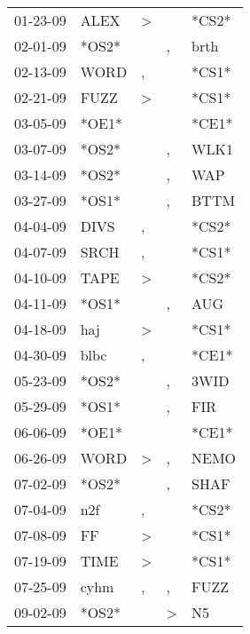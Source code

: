 \begin{supertabular}{lllll}
 01-23-09 &   ALEX &     \textgreater &                  &  *CS2* \\
 02-01-09 &  *OS2* &                  &                , &   brth \\
 02-13-09 &   WORD &                , &                  &  *CS1* \\
 02-21-09 &   FUZZ &     \textgreater &                  &  *CS1* \\
 03-05-09 &  *OE1* &                  &                  &  *CE1* \\
 03-07-09 &  *OS2* &                  &                , &   WLK1 \\
 03-14-09 &  *OS2* &                  &                , &    WAP \\
 03-27-09 &  *OS1* &                  &                , &   BTTM \\
 04-04-09 &   DIVS &                , &                  &  *CS2* \\
 04-07-09 &   SRCH &                , &                  &  *CS1* \\
 04-10-09 &   TAPE &     \textgreater &                  &  *CS2* \\
 04-11-09 &  *OS1* &                  &                , &    AUG \\
 04-18-09 &    haj &     \textgreater &                  &  *CS1* \\
 04-30-09 &   blbc &                , &                  &  *CE1* \\
 05-23-09 &  *OS2* &                  &                , &   3WID \\
 05-29-09 &  *OS1* &                  &                , &    FIR \\
 06-06-09 &  *OE1* &                  &                  &  *CE1* \\
 06-26-09 &   WORD &     \textgreater &                , &   NEMO \\
 07-02-09 &  *OS2* &                  &                , &   SHAF \\
 07-04-09 &    n2f &                , &                  &  *CS2* \\
 07-08-09 &     FF &     \textgreater &                  &  *CS1* \\
 07-19-09 &   TIME &     \textgreater &                  &  *CS1* \\
 07-25-09 &   cyhm &                , &                , &   FUZZ \\
 09-02-09 &  *OS2* &                  &     \textgreater &     N5 \\

\end{supertabular}

